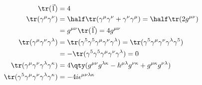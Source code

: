 \begin{subequations}
  \begin{align}
    \tr( \vec{1} ) &= 4 \\
    \tr( \gamma^{\mu} \gamma^{\nu} ) &= \half \tr( \gamma^{\mu} \gamma^{\nu} + \gamma^{\nu} \gamma^{\mu} ) = \half \tr(2 g^{\mu \nu}) \nonumber \\ &= g^{\mu \nu} \tr(\vec{1} ) = 4 g^{\mu \nu} \\
    \tr( \gamma^{\mu} \gamma^{\nu} \gamma^{\lambda}) &= \tr(\gamma^5 \gamma^5 \gamma^{\mu} \gamma^{\nu} \gamma^{\lambda}) = \tr(\gamma^5 \gamma^{\mu} \gamma^{\nu} \gamma^{\lambda} \gamma^5) \nonumber\\
&= - \tr( \gamma^5 \gamma^5 \gamma^{\mu} \gamma^{\nu} \gamma^{\lambda}) = 0 \\
    \tr(\gamma^{\mu} \gamma^{\nu} \gamma^{\lambda} \gamma^{\kappa}) &= 4 \qty(g^{\mu \nu}g^{\lambda \kappa}-h^{\mu \lambda} g^{\nu \kappa} + g^{\mu \kappa} g^{\nu \lambda}) \\
    \tr(\gamma^5 \gamma^{\mu} \gamma^{\nu} \gamma^{\lambda} \gamma^{\kappa}) &= - 4 i \epsilon^{\mu \nu \lambda \kappa}
  \end{align}
\end{subequations}

